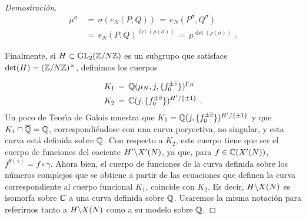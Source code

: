 \begin{proof}[Demostraci\'{o}n]
\begin{align*}
 \mu^{\sigma} &\,=\,\sigma(e_{N}(P,Q))\,=\,e_{N}(P^{\sigma},Q^{\sigma})\\
 &\,=\,e_{N}(P,Q)^{\det(\rho(\sigma))}\,=\,\mu^{\det(\rho(\sigma))}\text{ .}
\end{align*}

Finalmente, si $H\subset\mathrm{GL}_{2}(\mathbb{Z}/N\mathbb{Z})$ es un subgrupo que satisface
$\mathrm{det}(H)=(\mathbb{Z}/N\mathbb{Z})^{\times}$, definimos los cuerpos

\begin{align*}
K_{1} & \,=\,\mathbb{Q}(\mu_{N},j,\{f_{0}^{\pm\overline{v}}\})^{\Gamma_{H}}\\
K_{2} & \,=\,\mathbb{C}(j,\{f_{0}^{\pm\overline{v}}\})^{H'/\{\pm 1\}}\text{ .}
\end{align*}
Un poco de Teor\'{\i}a de Galois muestra que
$K_{1}=\mathbb{Q}(j,\{f_{0}^{\pm\overline{v}}\})^{H'/\{\pm 1\}}$ y que
$K_{1}\cap\overline{\mathbb{Q}}=\mathbb{Q}$, correspondi\'{e}ndose con una curva
poryectiva, no singular, y esta curva est\'{a} definida sobre $\mathbb{Q}$.
Con respecto a $K_{2}$, este cuerpo tiene que ser el cuerpo de funciones del
cociente $H'\backslash X'(N)$, ya que, para $f\in\mathbb{C}(X'(N))$,
$f^{\theta(\gamma)}=f\circ\gamma$. Ahora bien, el cuerpo de funciones de la
curva definida sobre los n\'{u}meros complejos que se obtiene a partir de las
ecuaciones que definen la curva correspondiente al cuerpo funcional $K_{1}$,
coincide con $K_{2}$. Es decir, $H\backslash X(N)$ es isomorfa sobre $\mathbb{C}$ a una
curva definida sobre $\mathbb{Q}$. Usaremos la misma notaci\'{o}n para referirnos
tanto a $H\backslash X(N)$ como a su modelo sobre $\mathbb{Q}$.

\end{proof}

